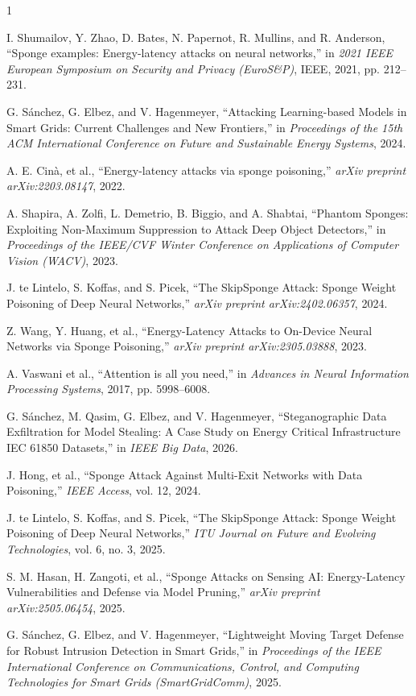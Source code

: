 \begin{thebibliography}{1}

I. Shumailov, Y. Zhao, D. Bates, N. Papernot, R. Mullins, and R. Anderson, ``Sponge examples: Energy-latency attacks on neural networks,'' in \emph{2021 IEEE European Symposium on Security and Privacy (EuroS\&P)}, IEEE, 2021, pp. 212--231.

G. Sánchez, G. Elbez, and V. Hagenmeyer, ``Attacking Learning-based Models in Smart Grids: Current Challenges and New Frontiers,'' in \emph{Proceedings of the 15th ACM International Conference on Future and Sustainable Energy Systems}, 2024.

A. E. Cinà, et al., ``Energy-latency attacks via sponge poisoning,'' \emph{arXiv preprint arXiv:2203.08147}, 2022.

A. Shapira, A. Zolfi, L. Demetrio, B. Biggio, and A. Shabtai, ``Phantom Sponges: Exploiting Non-Maximum Suppression to Attack Deep Object Detectors,'' in \emph{Proceedings of the IEEE/CVF Winter Conference on Applications of Computer Vision (WACV)}, 2023.

J. te Lintelo, S. Koffas, and S. Picek, ``The SkipSponge Attack: Sponge Weight Poisoning of Deep Neural Networks,'' \emph{arXiv preprint arXiv:2402.06357}, 2024.

Z. Wang, Y. Huang, et al., ``Energy-Latency Attacks to On-Device Neural Networks via Sponge Poisoning,'' \emph{arXiv preprint arXiv:2305.03888}, 2023.

A. Vaswani et al., ``Attention is all you need,'' in \emph{Advances in Neural Information Processing Systems}, 2017, pp. 5998--6008.

G. Sánchez, M. Qasim, G. Elbez, and V. Hagenmeyer, ``Steganographic Data Exfiltration for Model Stealing: A Case Study on Energy Critical Infrastructure IEC 61850 Datasets,'' in \emph{IEEE Big Data}, 2026.

J. Hong, et al., ``Sponge Attack Against Multi-Exit Networks with Data Poisoning,'' \emph{IEEE Access}, vol. 12, 2024.

J. te Lintelo, S. Koffas, and S. Picek, ``The SkipSponge Attack: Sponge Weight Poisoning of Deep Neural Networks,'' \emph{ITU Journal on Future and Evolving Technologies}, vol. 6, no. 3, 2025.

S. M. Hasan, H. Zangoti, et al., ``Sponge Attacks on Sensing AI: Energy-Latency Vulnerabilities and Defense via Model Pruning,'' \emph{arXiv preprint arXiv:2505.06454}, 2025.

G. Sánchez, G. Elbez, and V. Hagenmeyer, ``Lightweight Moving Target Defense for Robust Intrusion Detection in Smart Grids,'' in \emph{Proceedings of the IEEE International Conference on Communications, Control, and Computing Technologies for Smart Grids (SmartGridComm)}, 2025.

\end{thebibliography}
